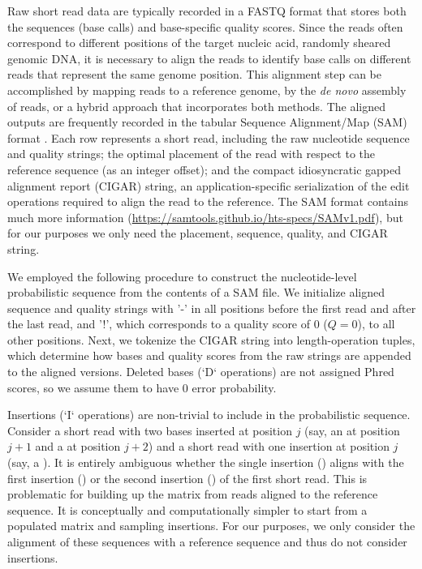 \documentclass[10pt]{article}
\begin{document}
Raw short read data are typically recorded in a FASTQ format that stores both the sequences (base calls) and base-specific quality scores.
Since the reads often correspond to different positions of the target nucleic acid, \eg randomly sheared genomic DNA, it is necessary to align the reads to identify base calls on different reads that represent the same genome position.
This alignment step can be accomplished by mapping reads to a reference genome, by the \emph{de novo} assembly of reads, or a hybrid approach that incorporates both methods.
The aligned outputs are frequently recorded in the tabular Sequence Alignment/Map (SAM) format \citep{liSequenceAlignmentMap2009}.
Each row represents a short read, including the raw nucleotide sequence and quality strings; the optimal placement of the read with respect to the reference sequence (as an integer offset); and the compact idiosyncratic gapped alignment report (CIGAR) string, an application-specific serialization of the edit operations required to align the read to the reference.
The SAM format contains much more information (\url{https://samtools.github.io/hts-specs/SAMv1.pdf}), but for our purposes we only need the placement, sequence, quality, and CIGAR string.


We employed the following procedure to construct the nucleotide-level probabilistic sequence from the contents of a SAM file.
We initialize aligned sequence and quality strings with '-' in all positions before the first read and after the last read, and '!', which corresponds to a quality score of 0 ($Q=0$), to all other positions.
Next, we tokenize the CIGAR string into length-operation tuples, which determine how bases and quality scores from the raw strings are appended to the aligned versions.
Deleted bases (`D` operations) are not assigned Phred scores, so we assume them to have 0 error probability.

Insertions (`I` operations) are non-trivial to include in the probabilistic sequence.
Consider a short read with two bases inserted at position $j$ (say, an  at position $j+1$ and a  at position $j+2$) and a short read with one insertion at position $j$ (say, a ).
It is entirely ambiguous whether the single insertion () aligns with the first insertion () or the second insertion () of the first short read. 
This is problematic for building up the matrix from reads aligned to the reference sequence.
It is conceptually and computationally simpler to start from a populated matrix and sampling insertions.
For our purposes, we only consider the alignment of these sequences with a reference sequence and thus do not consider insertions.
\end{document}
